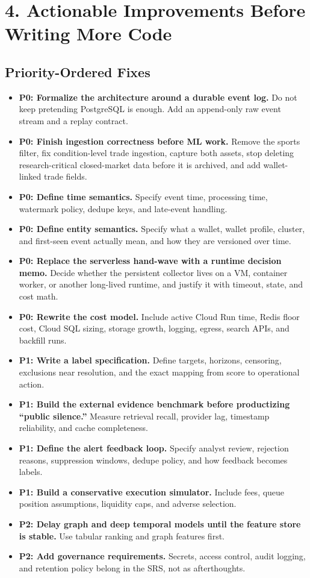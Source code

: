 \documentclass[11pt,letterpaper]{article}
\begin{document}
\section{4. Actionable Improvements Before Writing More Code}

\subsection{Priority-Ordered Fixes}

\begin{itemize}[nosep]
    \item \textbf{P0: Formalize the architecture around a durable event log.} Do not keep pretending PostgreSQL is enough. Add an append-only raw event stream and a replay contract.
    \item \textbf{P0: Finish ingestion correctness before ML work.} Remove the sports filter, fix condition-level trade ingestion, capture both assets, stop deleting research-critical closed-market data before it is archived, and add wallet-linked trade fields.
    \item \textbf{P0: Define time semantics.} Specify event time, processing time, watermark policy, dedupe keys, and late-event handling.
    \item \textbf{P0: Define entity semantics.} Specify what a wallet, wallet profile, cluster, and first-seen event actually mean, and how they are versioned over time.
    \item \textbf{P0: Replace the serverless hand-wave with a runtime decision memo.} Decide whether the persistent collector lives on a VM, container worker, or another long-lived runtime, and justify it with timeout, state, and cost math.
    \item \textbf{P0: Rewrite the cost model.} Include active Cloud Run time, Redis floor cost, Cloud SQL sizing, storage growth, logging, egress, search APIs, and backfill runs.
    \item \textbf{P1: Write a label specification.} Define targets, horizons, censoring, exclusions near resolution, and the exact mapping from score to operational action.
    \item \textbf{P1: Build the external evidence benchmark before productizing ``public silence.''} Measure retrieval recall, provider lag, timestamp reliability, and cache completeness.
    \item \textbf{P1: Define the alert feedback loop.} Specify analyst review, rejection reasons, suppression windows, dedupe policy, and how feedback becomes labels.
    \item \textbf{P1: Build a conservative execution simulator.} Include fees, queue position assumptions, liquidity caps, and adverse selection.
    \item \textbf{P2: Delay graph and deep temporal models until the feature store is stable.} Use tabular ranking and graph features first.
    \item \textbf{P2: Add governance requirements.} Secrets, access control, audit logging, and retention policy belong in the SRS, not as afterthoughts.
\end{itemize}
\end{document}
